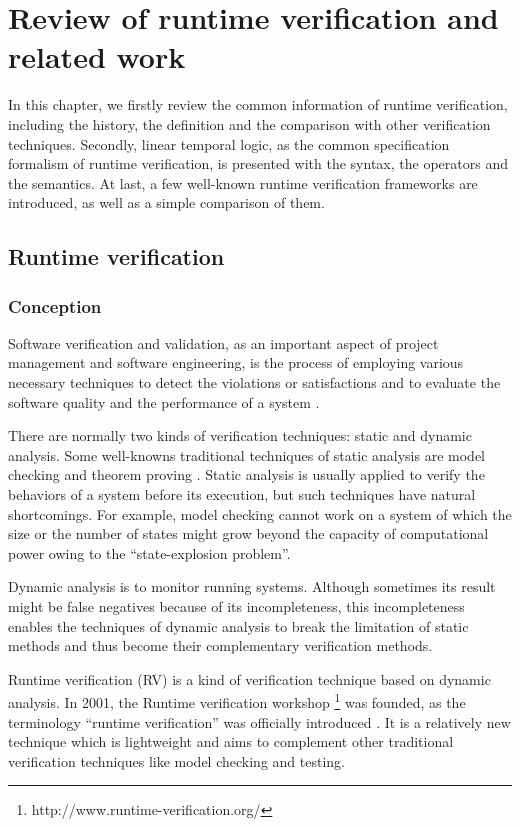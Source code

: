 
\chapter{Review of runtime verification and related work}

In this chapter, we firstly review the common information of runtime verification, including the history, the definition and the comparison with other verification techniques. Secondly, linear temporal logic, as the common specification formalism of runtime verification, is presented with the syntax, the operators and the semantics. At last, a few well-known runtime verification frameworks are introduced, as well as a simple comparison of them.

\section{Runtime verification}

\subsection{Conception}

Software verification and validation, as an important aspect of project management and software engineering, is the process of employing various necessary techniques to detect the violations or satisfactions and to evaluate the software quality and the performance of a system \citep{ieeestd2012}.

There are normally two kinds of verification techniques: static and dynamic analysis. Some well-knowns traditional techniques of static analysis are model checking \citep{clarke1999model} and theorem proving \citep{heisel1990tactical}. Static analysis is usually applied to verify the behaviors of a system before its execution, but such techniques have natural shortcomings. For example, model checking cannot work on a system of which the size or the number of states might grow beyond the capacity of computational power owing to the ``state-explosion problem''.

Dynamic analysis is to monitor running systems. Although sometimes its result might be false negatives because of its incompleteness, this incompleteness enables the techniques of dynamic analysis to break the limitation of static methods and thus become their complementary verification
methods. \citep{falcone2013tutorial}

Runtime verification (RV) is a kind of verification technique based on dynamic analysis. In 2001, the Runtime verification workshop \footnote{http://www.runtime-verification.org/} was founded, as the terminology ``runtime verification'' was officially introduced \citep{wiki:rv}. It is a relatively new technique which is lightweight and aims to complement other traditional verification techniques like model checking and testing.


